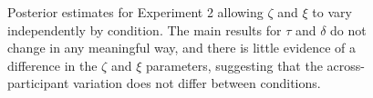 \documentclass[doc,biblatex,floatsintext]{apa7}
\begin{document}
\begin{figure}
\vspace*{2pt}
\caption{Posterior estimates for Experiment 2 allowing $\zeta$ and $\xi$ to vary independently by condition. The main results for $\tau$ and $\delta$ do not change in any meaningful way, and there is little evidence of a difference in the $\zeta$ and $\xi$ parameters, suggesting that the across-participant variation does not differ between conditions.}
\label{supp4}
\end{figure}
\end{document}
